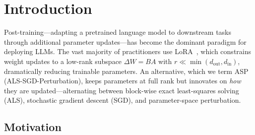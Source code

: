 \documentclass[11pt]{article}
\begin{document}
\begin{abstract}
\textbf{ASP serves as a stress test} confirming the primacy of parameter form over optimizer choice. ASP's ALS phase achieves exact closed-form solutions at full-rank computational cost, yet under LoRA this information must pass through a rank-$r$ bottleneck, producing robust negative synergy across 7 independent comparisons. ASP also reveals a fundamental \textit{depth boundary} at $\sim$26 layers: ALS perturbation through residual connections exceeds SGD recovery capacity for $L \geq 28$, confirmed by 11 failed attempts on Qwen2.5-7B across two distributed backends. Within the stable regime ($L \leq 24$), ASP provides implicit regularization, maintaining train--eval loss parity at 1,200 steps while AdamW overfits.

The unified design rule $r^* = \max(8, \lceil\eta \cdot L/d_h\rceil)$ and the $\eta$ nomogram (regression $R^2 = 0.88$ across 7 architectures) provide actionable guidance: of 14 popular architectures, only SmolLM2-135M requires $r > 8$. Our results caution that perplexity on small in-distribution evaluation sets is an unreliable proxy for post-training quality---a practice that remains widespread in the PEFT literature.
\end{abstract}

\section{Introduction}

Post-training---adapting a pretrained language model to downstream tasks through additional parameter updates---has become the dominant paradigm for deploying LLMs. The vast majority of practitioners use LoRA~\cite{hu2022lora}, which constrains weight updates to a low-rank subspace $\Delta W = BA$ with $r \ll \min(d_{\text{out}}, d_{\text{in}})$, dramatically reducing trainable parameters. An alternative, which we term ASP (ALS-SGD-Perturbation), keeps parameters at full rank but innovates on \textit{how} they are updated---alternating between block-wise exact least-squares solving (ALS), stochastic gradient descent (SGD), and parameter-space perturbation.

\subsection{Motivation}
\end{document}
